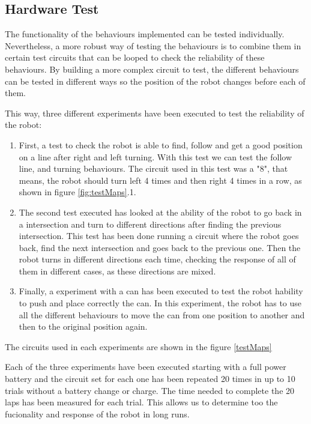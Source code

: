 
\subsection{Hardware Test}

The functionality of the behaviours implemented can be tested individually.
Nevertheless, a more robust way of testing the behaviours is to combine them in certain test circuits that can be looped to check the reliability of these behaviours.
By building a more complex circuit to test, the different behaviours can be tested in different ways so the position of the robot changes before each of them.

This way, three different experiments have been executed to test the reliability of the robot:

\begin{enumerate}
	\item First, a test to check the robot is able to find, follow and get a good position on a line after right and left turning. 
With this test we can test the follow line, and turning behaviours.
The circuit used in this test was a "8", that means, the robot should turn left 4 times and then right 4 times in a row, 
as shown in figure \ref{fig:testMaps}.1.

	\item The second test executed has looked at the ability of the robot to go back in a intersection and turn to different directions after finding the previous intersection.
This test has been done running a circuit where the robot goes back, find the next intersection and goes back to the previous one. 
Then the robot turns in different directions each time, checking the response of all of them in different cases, as these directions are mixed.

	\item Finally, a experiment with a can has been executed to test the robot hability to push and place correctly the can.
In this experiment, the robot has to use all the different behaviours to move the can from one position to another and then to the original position again.

\end{enumerate}

The circuits used in each experiments are shown in the figure \ref{testMaps}

Each of the three experiments have been executed starting with a full power battery and the circuit set for each one has been repeated 20 times in up to 10 trials without a battery change or charge.
The time needed to complete the 20 laps has been measured for each trial.
This allows us to determine too the fucionality and response of the robot in long runs.

